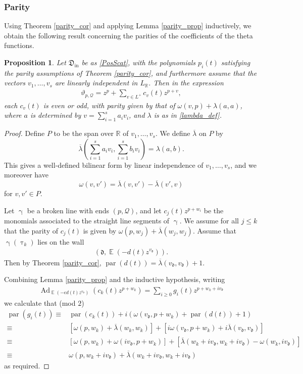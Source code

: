 \documentclass{amsart}
\DeclareMathOperator{\parit}{par}
\DeclareMathOperator{\In}{in}
\DeclareMathOperator{\EE}{\mathbb{E}}
\DeclareMathOperator{\Ad}{Ad}
\let\f=\mathfrak
\newcommand {\sQ} {\mathcal{Q}}
\renewcommand{\gamma}{\upgamma}
\renewcommand{\tau}{\uptau}
\theoremstyle{plain}%
\newtheorem{prop}[thm]{Proposition}
\theoremstyle{definition}
\theoremstyle{remark}
\begin{document}
\subsubsection{Parity}
Using Theorem \ref{parity_cor} and applying Lemma \ref{parity_prop} inductively, we obtain the following result concerning the parities of the coefficients of the theta functions.
\begin{prop}\label{ParitProp}
Let $\f{D}_{\In}$ be as \eqref{PosScat}, with the polynomials $p_i(t)$ satisfying the parity assumptions of Theorem \ref{parity_cor}, and furthermore assume that the vectors $v_1,\ldots,v_s$ are linearly independent in $L_{\mathbb{R}}$.  Then in the expression 
\begin{align*}
    \vartheta_{p,\sQ}=z^p+ \sum_{v\in L^+} c_v(t)z^{p+v},
\end{align*}
each $c_v(t)$ is even or odd, with parity given by that of $\omega(v,p)+\lambda(a,a)$, where $a$ is determined by $v=\sum_{i=1}^s a_i v_i$, 
and $\lambda$ is  as in \eqref{lambda_def}. \end{prop}
\begin{proof}
Define $P$ to be the span over $\mathbb{R}$ of $v_1,\ldots,v_s$.  We define $\overline{\lambda}$ on $P$ by 
\[
\overline{\lambda}\left(\sum_{i=1}^s a_iv_i,\sum_{i=1}^s b_iv_i\right)=\lambda(a,b).
\]
This gives a well-defined bilinear form by linear independence of $v_1,\ldots, v_s$, and we moreover have
\[
\omega(v,v')=\overline{\lambda}(v,v')-\overline{\lambda}(v',v)
\]
for $v,v'\in P$.


Let $\gamma$ be a broken line with ends $(p,\sQ)$, and let $c_j(t)z^{p+w_i}$ be the monomials associated to the straight line segments of $\gamma$.  We assume for all $j\leq k$ that the parity of $c_j(t)$ is given by $\omega(p,w_j)+\overline{\lambda}(w_j,w_j)$.  Assume that $\gamma(\tau_k)$ lies on the wall
\begin{align}
(\f{d},\EE(-d(t)z^{v_{\f{d}}})).
\end{align}
Then by Theorem \ref{parity_cor}, $\parit(d(t))=\overline{\lambda}(v_{\f{d}},v_{\f{d}})+1$.

Combining Lemma \ref{parity_prop} and the inductive hypothesis, writing
\begin{align*}
    \Ad_{\EE(-\epsilon d(t)z^{v_{\f{d}}})}(c_k(t)z^{p+w_k})=\sum_{i\geq 0}g_i(t)z^{p+w_k+iv_{\f{d}}}
\end{align*}
we calculate that (mod $2$) 
\begin{align*}
\parit(g_i(t))\equiv&\parit(c_k(t))+i(\omega(v_{\f{d}},p+w_k)+\parit(d(t))+1)\\\equiv&[\omega(p,w_k)+\overline{\lambda}(w_k,w_k)]+[i\omega(v_{\f{d}},p+w_k)+i\overline{\lambda}(v_{\f{d}},v_{\f{d}})]\\
\equiv&[\omega(p,w_k)+\omega(iv_{\f{d}},p+w_k)] + [\overline{\lambda}(w_k+iv_{\f{d}},w_k+iv_{\f{d}}) - \omega(w_k,iv_{\f{d}})]\\
\equiv&\omega(p,w_k+i v_{\f{d}})+\overline{\lambda}(w_k+iv_{\f{d}},w_k+iv_{\f{d}})
\end{align*}
as required.
\end{proof}
\end{document}
